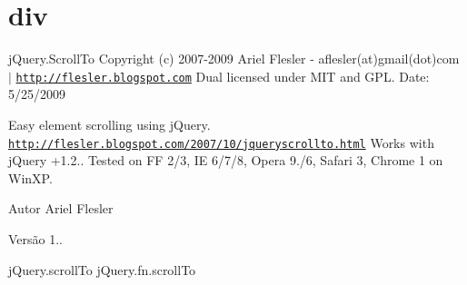 \hypertarget{div-example}{\section{div}
}
j\-Query.\-Scroll\-To Copyright (c) 2007-\/2009 Ariel Flesler -\/ aflesler(at)gmail(dot)com $|$ \href{http://flesler.blogspot.com}{\tt http\-://flesler.\-blogspot.\-com} Dual licensed under M\-I\-T and G\-P\-L. Date\-: 5/25/2009

Easy element scrolling using j\-Query. \href{http://flesler.blogspot.com/2007/10/jqueryscrollto.html}{\tt http\-://flesler.\-blogspot.\-com/2007/10/jqueryscrollto.\-html} Works with j\-Query +1.2.. Tested on F\-F 2/3, I\-E 6/7/8, Opera 9./6, Safari 3, Chrome 1 on Win\-X\-P.

\begin{DoxyAuthor}{Autor}
Ariel Flesler 
\end{DoxyAuthor}
\begin{DoxyVersion}{Versão}
1..
\end{DoxyVersion}
j\-Query.\-scroll\-To  j\-Query.\-fn.\-scroll\-To 
